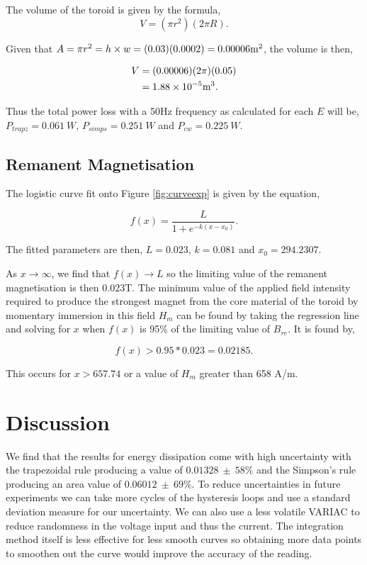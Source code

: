 \documentclass{article}
\begin{document}
The volume of the toroid is given by the formula,
\begin{equation}
    V = (\pi r^2) (2\pi R).
\end{equation}

Given that $A=\pi r^2 = h \times w = (0.03)(0.0002) = 0.00006 \text{m\textsuperscript{2}}$,
the volume is then,

\begin{equation}
    \begin{split}
        V &= (0.00006)(2\pi)(0.05) \\
        &= 1.88 \times 10^{-5} \text{m\textsuperscript{3}}.
    \end{split}
\end{equation}

Thus the total power loss with a 50Hz frequency as calculated for each $E$ will be, 
$P_{trapz} = 0.061 \: W$, $P_{simps} = 0.251 \: W$ and $P_{cw} = 0.225 \: W$.

\subsection{Remanent Magnetisation}
The logistic curve fit onto Figure \ref{fig:curveexp} is given by the equation,

\begin{equation}
    f(x) = \frac{L}{1+e^{-k(x-x_0)}}.
\end{equation}

The fitted parameters are then, $L=0.023$, $k =0.081$ and $x_0 = 294.2307$.

As $x \rightarrow \infty$, we find that $f(x) \rightarrow L$ so the limiting value of the remanent
magnetisation is then 0.023T. The minimum value of the applied field intensity required to produce 
the strongest magnet from the core material of the toroid by momentary immersion in this field $H_m$
can be found by taking the regression line and solving for $x$ when $f(x)$ is 95\% of the limiting 
value of $B_{re}$. It is found by,

\begin{equation}
    f(x) > 0.95*0.023=0.02185.
\end{equation}

This occurs for $x > 657.74$ or a value of $H_m$ greater than 658 A/m.

\section{Discussion}
We find that the results for energy dissipation come with high uncertainty with
the trapezoidal rule producing a value of $0.01328 \: \pm \: 58\%$ and the Simpson's 
rule producing an area value of $0.06012 \: \pm \: 69\%$. To reduce uncertainties 
in future experiments we can take more cycles of the hysteresis loops and use a 
standard deviation measure for our uncertainty. We can also use a less volatile VARIAC
to reduce randomness in the voltage input and thus the current. The integration method
itself is less effective for less smooth curves so obtaining more data points to smoothen
out the curve would improve the accuracy of the reading.
\end{document}
